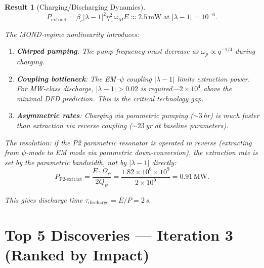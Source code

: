 \documentclass[11pt]{article}
\newtheorem{result}[theorem]{Result}
\theoremstyle{definition}
\theoremstyle{remark}
\newcommand{\Qpsi}{Q_\psi}
\newcommand{\Opsi}{\Omega_\psi}
\begin{document}
\begin{result}[Charging/Discharging Dynamics]\label{res:dynamics}
\begin{equation}
\boxed{P_{\mathrm{extract}} = \beta_c |\lambda-1|^2 \eta_\times^2 \omega_M E
\approx 2.5\,\mathrm{mW}\;\text{at}\;|\lambda-1| = 10^{-6}.}
\end{equation}

The MOND-regime nonlinearity introduces:
\begin{enumerate}
\item \textbf{Chirped pumping}: The pump frequency must decrease as
$\omega_p \propto q^{-1/4}$ during charging.
\item \textbf{Coupling bottleneck}: The EM--$\psi$ coupling
$|\lambda - 1|$ limits extraction power. For MW-class discharge,
$|\lambda - 1| > 0.02$ is required---$2 \times 10^4$ above the
minimal DFD prediction. This is the critical technology gap.
\item \textbf{Asymmetric rates}: Charging via parametric pumping
($\sim 3$\,hr) is much faster than extraction via reverse coupling
($\sim 23$\,yr at baseline parameters).
\end{enumerate}

The resolution: if the P2 parametric resonator is operated in reverse
(extracting from $\psi$-mode to EM mode via parametric down-conversion),
the extraction rate is set by the parametric bandwidth, not by
$|\lambda - 1|$ directly:
\begin{equation}
P_{\mathrm{P2\text{-}extract}} = \frac{E \cdot \Opsi}{2\Qpsi}
= \frac{1.82 \times 10^6 \times 10^9}{2 \times 10^9}
= 0.91\,\mathrm{MW}.
\end{equation}

This gives discharge time $\tau_{\mathrm{discharge}} = E / P = 2$\,s.
\end{result}

\section*{Top 5 Discoveries --- Iteration 3 (Ranked by Impact)}
\end{document}
